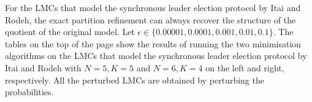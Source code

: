 For the LMCs that model the synchronous leader election protocol by Itai and Rodeh, the exact partition refinement can always recover the structure of the quotient of the original model. Let $\epsilon \in \{0.00001 ,0.0001, 0.001, 0.01, 0.1\}$. The tables on the top of the page show the results of running the two minimisation algorithms on the LMCs that model the synchronous leader election protocol by Itai and Rodeh with $N =5, K=5$ and $N =6, K=4$ on the left and right, respectively. All the perturbed LMCs are obtained by perturbing the probabilities. 

\begin{figure}[t]	
	\begin{floatrow}
\end{floatrow}
\end{figure}

